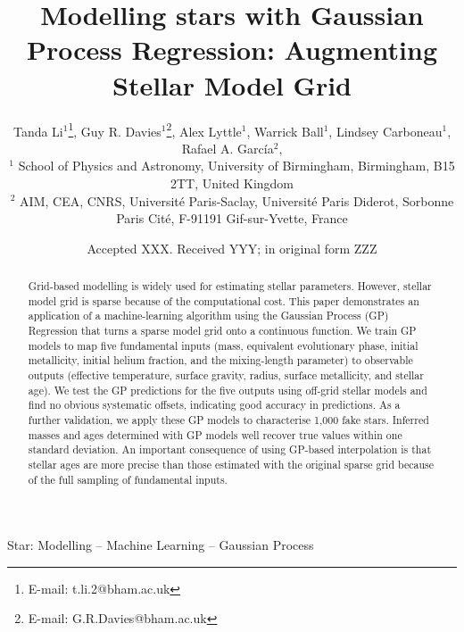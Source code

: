 \documentclass[fleqn,usenatbib]{mnras}
\title[Modelling stars with GP]{Modelling stars with Gaussian Process Regression: Augmenting Stellar Model Grid}
\author[T. Li et al.]{
Tanda Li$^{1}$\thanks{E-mail: t.li.2@bham.ac.uk},
Guy R. Davies$^{1}$\thanks{E-mail: G.R.Davies@bham.ac.uk},
Alex Lyttle$^{1}$,
Warrick Ball$^{1}$,
Lindsey Carboneau$^{1}$,
\newauthor
Rafael A. Garc\'ia$^{2}$,
\\
$^{1}$ School of Physics and Astronomy, University of Birmingham, Birmingham, B15 2TT, United Kingdom\\
$^{2}$ AIM, CEA, CNRS, Universit\'e Paris-Saclay, Universit\'e Paris Diderot, Sorbonne Paris Cit\'e, F-91191 Gif-sur-Yvette, France
}
\date{Accepted XXX. Received YYY; in original form ZZZ}
\begin{document}
\label{firstpage}
\pagerange{\pageref{firstpage}--\pageref{lastpage}}
\maketitle

\begin{abstract}
Grid-based modelling is widely used for estimating stellar parameters. However, stellar model grid is sparse because of the computational cost. This paper demonstrates an application of a machine-learning algorithm using the Gaussian Process (GP) Regression that turns a sparse model grid onto a continuous function. We train GP models to map five fundamental inputs (mass, equivalent evolutionary phase, initial metallicity, initial helium fraction, and the mixing-length parameter) to observable outputs (effective temperature, surface gravity, radius, surface metallicity, and stellar age). 
%
%
We test the GP predictions for the five outputs using off-grid stellar models and find no obvious systematic offsets, indicating good accuracy in predictions. %
%
As a further validation, we apply these GP models to characterise 1,000 fake stars. Inferred masses and ages determined with GP models well recover true values within one standard deviation. 
An important consequence of using GP-based interpolation is that stellar ages are more precise than those estimated with the original sparse grid because of the full sampling of fundamental inputs.
%
\end{abstract}

\begin{keywords}
Star: Modelling -- Machine Learning -- Gaussian Process
\end{keywords}
\end{document}
